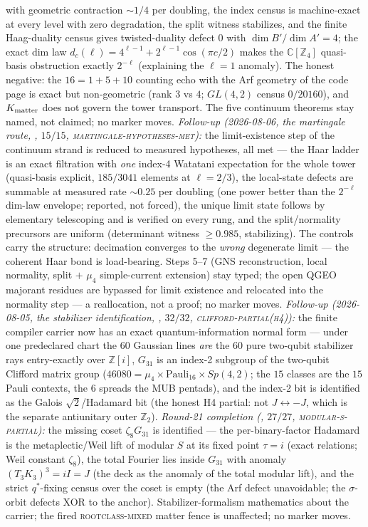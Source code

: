 \documentclass[11pt,a4paper]{article}
\newcommand{\Z}{\mathbb{Z}}
\theoremstyle{definition}
\begin{document}
with geometric contraction ${\sim}1/4$ per doubling, the index
census is machine-exact at every level with zero degradation, the
split witness stabilizes, and the finite Haag-duality census gives
twisted-duality defect $0$ with $\dim B'/\dim A'=4$; the exact dim
law $d_c(\ell)=4^{\ell-1}+2^{\ell-1}\cos(\pi c/2)$ makes the
$\mathbb C[\Z_4]$ quasi-basis obstruction exactly $2^{-\ell}$
(explaining the $\ell=1$ anomaly).  The honest negative: the
$16=1{+}5{+}10$ counting echo with the Arf geometry of the code
page is exact but non-geometric (rank $3$ vs $4$; $GL(4,2)$ census
$0/20160$), and $K_{\rm matter}$ does not govern the tower
transport.  The five continuum theorems stay named, not claimed;
no marker moves.
\emph{Follow-up (2026-08-06, the martingale route,
, $15/15$,
\textsc{martingale-hypotheses-met}):} the limit-existence step of
the continuum strand is reduced to measured hypotheses, all met ---
the Haar ladder is an exact filtration with \emph{one} index-4
Watatani expectation for the whole tower (quasi-basis explicit,
$185/3041$ elements at $\ell=2/3$), the local-state defects are
summable at measured rate ${\sim}0.25$ per doubling (one power
better than the $2^{-\ell}$ dim-law envelope; reported, not
forced), the unique limit state follows by elementary telescoping
and is verified on every rung, and the split/normality precursors
are uniform (determinant witness $\ge0.985$, stabilizing).  The
controls carry the structure: decimation converges to the
\emph{wrong} degenerate limit --- the coherent Haar bond is
load-bearing.  Steps 5--7 (GNS reconstruction, local normality,
split $+$ $\mu_4$ simple-current extension) stay typed; the open
QGEO majorant residues are bypassed for limit existence and
relocated into the normality step --- a reallocation, not a proof;
no marker moves.
\emph{Follow-up (2026-08-05, the stabilizer identification,
, $32/32$,
\textsc{clifford-partial(h4)}):} the finite compiler carrier now
has an exact quantum-information normal form --- under one
predeclared chart the $60$ Gaussian lines \emph{are} the $60$ pure
two-qubit stabilizer rays entry-exactly over $\Z[i]$, $G_{31}$ is
an index-2 subgroup of the two-qubit Clifford matrix group
($46080=\mu_4\times\mathrm{Pauli}_{16}\times Sp(4,2)$; the $15$
classes are the $15$ Pauli contexts, the $6$ spreads the MUB
pentads), and the index-2 bit is identified as the Galois
$\sqrt2$/Hadamard bit (the honest H4 partial: not
$J\leftrightarrow-J$, which is the separate antiunitary outer
$\Z_2$).  \emph{Round-21 completion
(, $27/27$,
\textsc{modular-s-partial}):} the missing coset $\zeta_8G_{31}$ is
identified --- the per-binary-factor Hadamard is the
metaplectic/Weil lift of modular $S$ at its fixed point $\tau=i$
(exact relations; Weil constant $\zeta_8$), the total Fourier lies
inside $G_{31}$ with anomaly $(T_3K_3)^3=iI=J$ (the deck as the
anomaly of the total modular lift), and the strict $q^{*}$-fixing
census over the coset is empty (the Arf defect unavoidable; the
$\sigma$-orbit defects XOR to the anchor).  Stabilizer-formalism
mathematics about the carrier; the fired \textsc{rootclass-mixed}
matter fence is unaffected; no marker moves.
\end{document}

